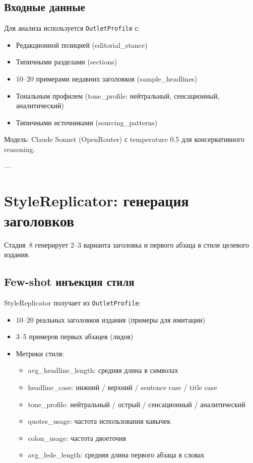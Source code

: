 \subsection{Входные данные}

Для анализа используется \verb|OutletProfile| с:
\begin{itemize}
  \item Редакционной позицией (editorial\_stance)
  \item Типичными разделами (sections)
  \item 10--20 примерами недавних заголовков (sample\_headlines)
  \item Тональным профилем (tone\_profile: нейтральный, сенсационный, аналитический)
  \item Типичными источниками (sourcing\_patterns)
\end{itemize}

Модель: Claude Sonnet (OpenRouter) с temperature 0.5 для консервативного reasoning.

---

\section{StyleReplicator: генерация заголовков}
\label{sec:style-replicator}

Стадия~8 генерирует 2--3 варианта заголовка и первого абзаца в стиле целевого издания.

\subsection{Few-shot инъекция стиля}

StyleReplicator получает из \verb|OutletProfile|:
\begin{itemize}
  \item 10--20 реальных заголовков издания (примеры для имитации)
  \item 3--5 примеров первых абзацев (лидов)
  \item Метрики стиля:
    \begin{itemize}
      \item avg\_headline\_length: средняя длина в символах
      \item headline\_case: нижний / верхний / sentence case / title case
      \item tone\_profile: нейтральный / острый / сенсационный / аналитический
      \item quotes\_usage: частота использования кавычек
      \item colon\_usage: частота двоеточия
      \item avg\_lede\_length: средняя длина первого абзаца в словах
    \end{itemize}
\end{itemize}

